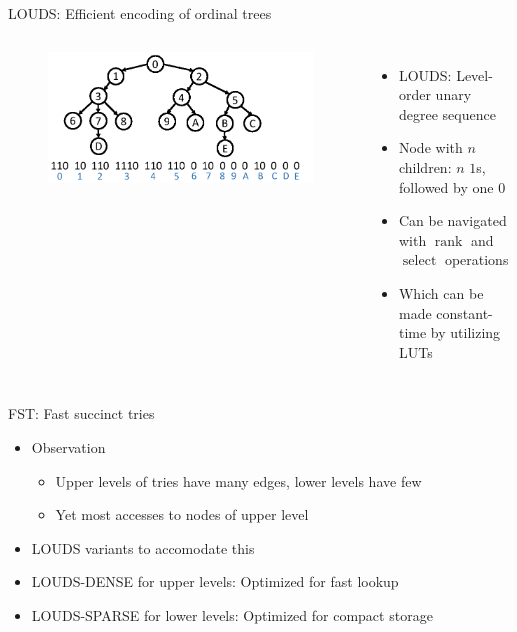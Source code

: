 \documentclass{beamer}
\begin{document}
\begin{frame}{LOUDS: Efficient encoding of ordinal trees}
		\begin{columns}
				\begin{figure}
						\centering
						\includegraphics[width=\textwidth]{resources/trie_louds.png}
						\caption{\autocite{zhangSuRFPracticalRange2018}}
				\end{figure}
				\begin{itemize}
						\item LOUDS: Level-order unary degree sequence \autocite{jacobsonSpaceefficientStaticTrees1989}
						\item Node with $n$ children: $n$ $1$s, followed by one $0$
						\item Can be navigated with $\operatorname{rank}$ and
								$\operatorname{select}$ operations
						\item Which can be made constant-time by utilizing LUTs
				\end{itemize}
		\end{columns}
\end{frame}

\begin{frame}{FST: Fast succinct tries}
		\begin{itemize}
				\item Observation
						\begin{itemize}
								\item Upper levels of tries have many edges, lower levels have few
								\item Yet most accesses to nodes of upper level
						\end{itemize}
				\item LOUDS variants to accomodate this
				\item LOUDS-DENSE for upper levels: Optimized for fast lookup
				\item LOUDS-SPARSE for lower levels: Optimized for compact storage
		\end{itemize}
\end{frame}
\end{document}

